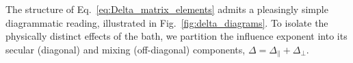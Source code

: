 




The structure of Eq.~\eqref{eq:Delta_matrix_elements} admits a pleasingly simple diagrammatic reading,
illustrated in Fig.~\ref{fig:delta_diagrams}. To isolate the physically distinct effects of the bath, we partition the influence exponent into its secular (diagonal) and mixing (off-diagonal) components, $\Delta = \Delta_{\parallel} + \Delta_{\perp}$.

